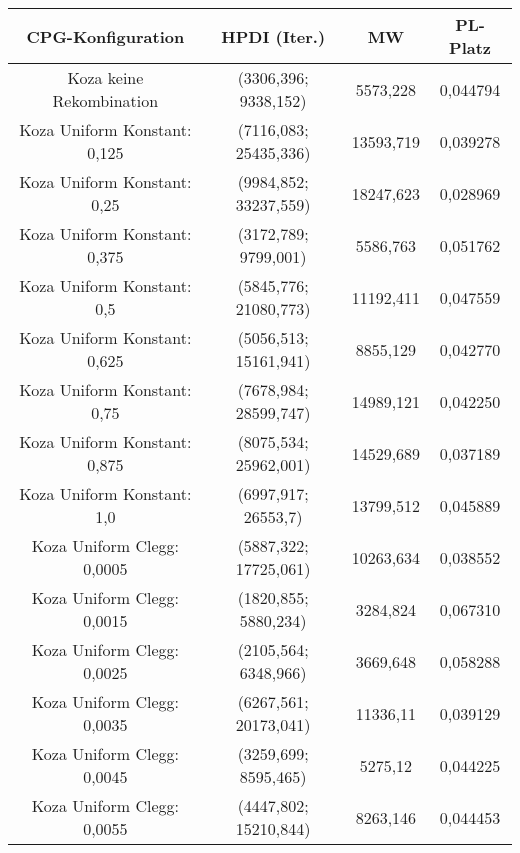 \begin{table}[H]
	\centering
	\begin{tabular}{c | c | c | c}
		\textbf{CPG-Konfiguration} & \textbf{HPDI (Iter.)} & \textbf{MW} & \textbf{PL-Platz}\\
		\hline
		Koza keine Rekombination & (3306,396; 9338,152) & 5573,228 & 0,044794\\
		\hline
		\hline
		Koza Uniform Konstant: 0,125 & (7116,083; 25435,336) & 13593,719 & 0,039278\\
		\hline
		Koza Uniform Konstant: 0,25 & (\color{red}9984,852\color{black}; \color{red}33237,559\color{black}) & \color{red}18247,623\color{black} & \color{red}0,028969\color{black}\\
		\hline
		Koza Uniform Konstant: 0,375 & (\color{Green}3172,789\color{black}; 9799,001) & 5586,763 & \color{Green}0,051762\color{black}\\
		\hline
		Koza Uniform Konstant: 0,5 & (5845,776; 21080,773) & 11192,411 & 0,047559\\
		\hline
		Koza Uniform Konstant: 0,625 & (5056,513; 15161,941) & 8855,129 & 0,042770\\
		\hline
		Koza Uniform Konstant: 0,75 & (7678,984; \color{red}28599,747\color{black}) & \color{red}14989,121\color{black} & 0,042250\\
		\hline
		Koza Uniform Konstant: 0,875 & (\color{red}8075,534\color{black}; 25962,001) & 14529,689 & 0,037189\\
		\hline
		Koza Uniform Konstant: 1,0 & (6997,917; 26553,7) & 13799,512 & 0,045889\\
		\hline
		\hline
		Koza Uniform Clegg: 0,0005 & (5887,322; 17725,061) & 10263,634 & 0,038552\\
		\hline
		Koza Uniform Clegg: 0,0015 & (\color{Green}1820,855\color{black}; \color{Green}5880,234\color{black}) & \color{Green}3284,824\color{black} & \color{Green}0,067310\color{black}\\
		\hline
		Koza Uniform Clegg: 0,0025 & (\color{Green}2105,564\color{black}; \color{Green}6348,966\color{black}) & \color{Green}3669,648\color{black} & \color{Green}0,058288\color{black}\\
		\hline
		Koza Uniform Clegg: 0,0035 & (6267,561; 20173,041) & 11336,11 & 0,039129\\
		\hline
		Koza Uniform Clegg: 0,0045 & (3259,699; \color{Green}8595,465\color{black}) & \color{Green}5275,12\color{black} & 0,044225\\
		\hline
		Koza Uniform Clegg: 0,0055 & (4447,802; 15210,844) & 8263,146 & 0,044453\\

\end{tabular}
\end{table}
